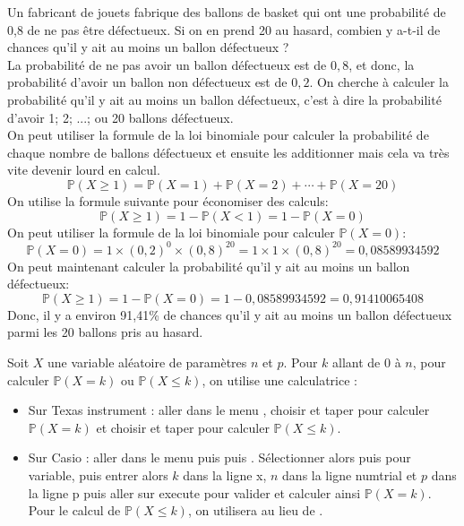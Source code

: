 \documentclass[french]{book}
\begin{document}
\begin{exemple}
Un fabricant de jouets fabrique des ballons de basket qui ont une probabilité de 0,8 de ne pas être défectueux. Si on en prend 20 au hasard, combien y a-t-il de chances qu'il y ait au moins un ballon défectueux ?\\

La probabilité de ne pas avoir un ballon défectueux est de $0,8$, et donc, la probabilité d'avoir un ballon non défectueux est de $0,2$. On cherche à calculer la probabilité qu'il y ait au moins un ballon défectueux, c'est à dire la probabilité d'avoir 1; 2; ...; ou 20 ballons défectueux.\\

On peut utiliser la formule de la loi binomiale pour calculer la probabilité de chaque nombre de ballons défectueux et ensuite les additionner mais cela va très vite devenir lourd en calcul.\\
$$\mathbb{P}(X \geq 1)= \mathbb{P}(X=1)+\mathbb{P}(X=2)+\cdots+\mathbb{P}(X=20)$$
 On utilise la formule suivante pour économiser des calculs:\\
$$\mathbb{P}(X \geq 1) = 1 - \mathbb{P}(X < 1)= 1- \mathbb{P}(X=0)$$
On peut utiliser la formule de la loi binomiale pour calculer $\mathbb{P}(X = 0)$:\\
$$\mathbb{P}(X = 0) = 1 \times (0,2)^0 \times (0,8)^{20} = 1 \times 1 \times (0,8)^{20} = 0,08589934592$$
On peut maintenant calculer la probabilité qu'il y ait au moins un ballon défectueux:
$$\mathbb{P}(X \geq 1) = 1 - \mathbb{P}(X = 0) = 1 - 0,08589934592 = 0,91410065408$$
Donc, il y a environ 91,41\% de chances qu'il y ait au moins un ballon défectueux parmi les 20 ballons pris au hasard.
\end{exemple}


\begin{rem}[Calcul pratique de $\mathbb{P}(X=k)$ et $\mathbb{P}(X\leq k)$]
Soit $X$ une variable aléatoire de paramètres $n$ et $p$. Pour $k$ allant de 0 à $n$, pour calculer $\mathbb{P}(X=k)$ ou $\mathbb{P}(X\leq k)$, on utilise une calculatrice :
\begin{itemize}
\item[$\bullet$] Sur Texas instrument : aller dans le menu , choisir  et taper \fbox{,}\fbox{,}\fbox{)} pour calculer $\mathbb{P}(X=k)$ et choisir  et taper \fbox{,}\fbox{,}\fbox{)} pour calculer $\mathbb{P}(X\leq k)$.
\item[$\bullet$] Sur Casio : aller dans le menu  puis  puis . Sélectionner alors  puis  pour variable, puis entrer alors $k$  dans la ligne \og{}x\fg{}, $n$ dans la ligne \og{}numtrial\fg{} et $p$ dans la ligne \og{}p\fg{} puis aller sur \og{}execute\fg{} pour valider et calculer ainsi $\mathbb{P}(X=k)$. Pour le calcul de  $\mathbb{P}(X\leq k)$, on utilisera  au lieu de .
\end{itemize}
\end{rem}
\end{document}
